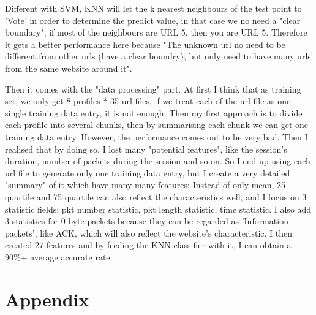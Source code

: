 \documentclass[12pt]{article}
\begin{document}
Different with SVM, KNN will let the k nearest neighbours of the test point to 'Vote' in order to determine the predict value, in that case we no need a "clear boundary", if most of the neighbours are URL 5, then you are URL 5. Therefore it gets a better performance here because "The unknown url no need to be different from other urls (have a clear boundry), but only need to have many urls from the same website around it".


Then it comes with the "data processing" part. At first I think that as training set, we only get 8 profiles * 35 url files, if we treat each of the url file as one single training data entry, it is not enough. Then my first approach is to divide each profile into several chunks, then by summarising each chunk we can get one training data entry. However, the performance comes out to be very bad. Then I realised that by doing so, I lost many "potential features", like the session's duration, number of packets during the session and so on. So I end up using each url file to generate only one training data entry, but I create a very detailed "summary" of it which have many many features: Instead of only mean, 25 quartile and 75 quartile can also reflect the characteristics well, and I focus on 3 statistic fields: pkt number statistic, pkt length statistic, time statistic. I also add 3 statistics for 0 byte packets because they can be regarded as 'Information packets', like ACK, which will also reflect the website's characteristic. I then created 27 features and by feeding the KNN classifier with it, I can obtain a 90\%+ average accurate rate.

\section{Appendix}
\end{document}
